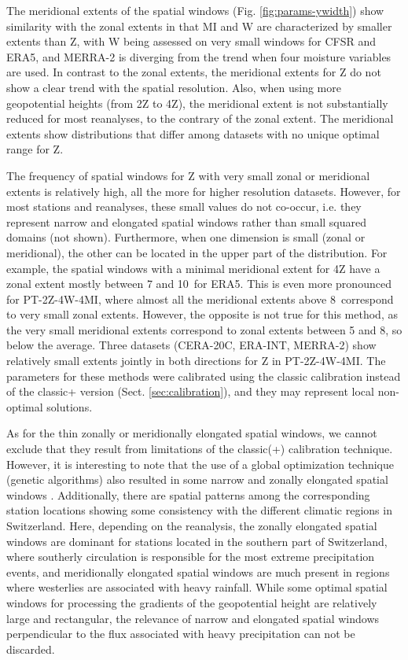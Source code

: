 \documentclass[alpha-refs]{wiley-article}
\begin{document}
The meridional extents of the spatial windows (Fig. \ref{fig:params-ywidth}) show similarity with the zonal extents in that MI and W are characterized by smaller extents than Z, with W being assessed on very small windows for CFSR and ERA5, and MERRA-2 is diverging from the trend when four moisture variables are used. In contrast to the zonal extents, the meridional extents for Z do not show a clear trend with the spatial resolution. Also, when using more geopotential heights (from 2Z to 4Z), the meridional extent is not substantially reduced for most reanalyses, to the contrary of the zonal extent. The meridional extents show distributions that differ among datasets with no unique optimal range for Z. 

The frequency of spatial windows for Z with very small zonal or meridional extents is relatively high, all the more for higher resolution datasets. However, for most stations and reanalyses, these small values do not co-occur, i.e. they represent narrow and elongated spatial windows rather than small squared domains (not shown). Furthermore, when one dimension is small (zonal or meridional), the other can be located in the upper part of the distribution. For example, the spatial windows with a minimal meridional extent for 4Z have a zonal extent mostly between 7 and 10\degree\ for ERA5. This is even more pronounced for PT-2Z-4W-4MI, where almost all the meridional extents above 8\degree\ correspond to very small zonal extents. However, the opposite is not true for this method, as the very small meridional extents correspond to zonal extents between 5 and 8\degree, so below the average. Three datasets (CERA-20C, ERA-INT, MERRA-2) show relatively small extents jointly in both directions for Z in PT-2Z-4W-4MI. The parameters for these methods were calibrated using the classic calibration instead of the classic+ version (Sect. \ref{sec:calibration}), and they may represent local non-optimal solutions. 

As for the thin zonally or meridionally elongated spatial windows, we cannot exclude that they result from limitations of the classic(+) calibration technique. However, it is interesting to note that the use of a global optimization technique (genetic algorithms) also resulted in some narrow and zonally elongated spatial windows \citep{Horton2018a}. Additionally, there are spatial patterns among the corresponding station locations showing some consistency with the different climatic regions in Switzerland. Here, depending on the reanalysis, the zonally elongated spatial windows are dominant for stations located in the southern part of Switzerland, where southerly circulation is responsible for the most extreme precipitation events, and meridionally elongated spatial windows are much present in regions where westerlies are associated with heavy rainfall. While some optimal spatial windows for processing the gradients of the geopotential height are relatively large and rectangular, the relevance of narrow and elongated spatial windows perpendicular to the flux associated with heavy precipitation can not be discarded.
\end{document}
